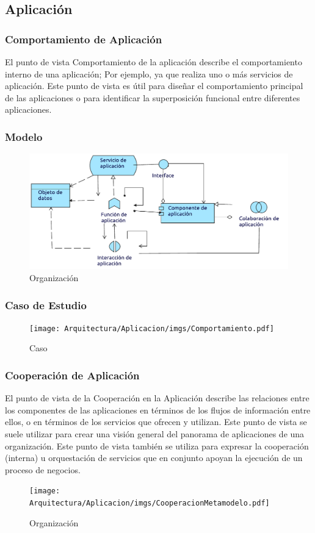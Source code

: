 \subsection{Aplicación}

\subsubsection{Comportamiento de Aplicación}
El punto de vista Comportamiento de la aplicación describe el comportamiento interno de una aplicación; Por ejemplo, ya que realiza uno o más servicios de aplicación. Este punto de vista es útil para diseñar el comportamiento principal de las aplicaciones o para identificar la superposición funcional entre diferentes aplicaciones.
\subsubsection{Modelo}
\begin{figure}[h!]
	\centering
	\includegraphics[width=\linewidth]{Desarrollo/ArquitecturaEmpresarial/Aplicacion/imgs/ComportamientoMetamodelo.pdf}
	\caption{Organización}
\end{figure}
\newpage
\subsubsection{Caso de Estudio}

\begin{figure}[h!]
	\centering
	\texttt{[image: Arquitectura/Aplicacion/imgs/Comportamiento.pdf]}
	\caption{Caso}
\end{figure}

\newpage

\subsubsection{Cooperación de Aplicación}
El punto de vista de la Cooperación en la Aplicación describe las relaciones entre los componentes de las aplicaciones en términos de los flujos de información entre ellos, o en términos de los servicios que ofrecen y utilizan. Este punto de vista se suele utilizar para crear una visión general del panorama de aplicaciones de una organización. Este punto de vista también se utiliza para expresar la cooperación (interna) u orquestación de servicios que en conjunto apoyan la ejecución de un proceso de negocios.
\begin{figure}[h!]
	\centering
	\texttt{[image: Arquitectura/Aplicacion/imgs/CooperacionMetamodelo.pdf]}
	\caption{Organización}
\end{figure}
\newpage
{}

